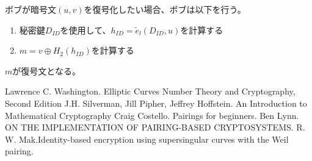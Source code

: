\documentclass{jsarticle}
\begin{document}
ボブが暗号文$(u,v)$を復号化したい場合、ボブは以下を行う。
\begin{enumerate}
\item 秘密鍵$D_{ID}$を使用して、$h_{ID} = \tilde{e}_{l}(D_{ID},u)$を計算する
\item $m = v \oplus H_{2}(h_{ID})$を計算する
\end{enumerate}

$m$が復号文となる。

\bigskip
\begin{thebibliography}{9}
    Lawrence C. Washington. Elliptic Curves Number Theory and Cryptography, Second Edition
    J.H. Silverman, Jill Pipher, Jeffrey Hoffstein. An Introduction to Mathematical Cryptography
    Craig Costello. Pairings for beginners.
    Ben Lynn. ON THE IMPLEMENTATION OF PAIRING-BASED CRYPTOSYSTEMS.    
  R. W. Mak.Identity-based encryption using supersingular curves with the Weil pairing.

\end{thebibliography}
\end{document}
